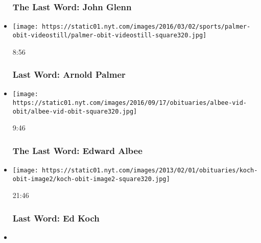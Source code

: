 \begin{itemize}
{  \subsubsection{The Last Word: John
  Glenn}\label{the-last-word-john-glenn}}
\item
  \href{https://www.nytimes.com/video/obituaries/100000001563119/last-word-arnold-palmer.html?action=click\&module=video-series-bar\&region=header\&pgtype=Article\&playlistId=video/last-word}{}

  \texttt{[image: https://static01.nyt.com/images/2016/03/02/sports/palmer-obit-videostill/palmer-obit-videostill-square320.jpg]}

  8:56

  \hypertarget{last-word-arnold-palmer}{%
  \subsubsection{Last Word: Arnold
  Palmer}\label{last-word-arnold-palmer}}
\item
  \href{https://www.nytimes.com/video/multimedia/1247463606959/the-last-word-edward-albee.html?action=click\&module=video-series-bar\&region=header\&pgtype=Article\&playlistId=video/last-word}{}

  \texttt{[image: https://static01.nyt.com/images/2016/09/17/obituaries/albee-vid-obit/albee-vid-obit-square320.jpg]}

  9:46

  \hypertarget{the-last-word-edward-albee}{%
  \subsubsection{The Last Word: Edward
  Albee}\label{the-last-word-edward-albee}}
\item
  \href{https://www.nytimes.com/video/obituaries/1194834046901/last-word-ed-koch.html?action=click\&module=video-series-bar\&region=header\&pgtype=Article\&playlistId=video/last-word}{}

  \texttt{[image: https://static01.nyt.com/images/2013/02/01/obituaries/koch-obit-image2/koch-obit-image2-square320.jpg]}

  21:46

  \hypertarget{last-word-ed-koch}{%
  \subsubsection{Last Word: Ed Koch}\label{last-word-ed-koch}}
\item
  \href{https://www.nytimes.com/video/us/1194834005471/last-word-barry-commoner.html?action=click\&module=video-series-bar\&region=header\&pgtype=Article\&playlistId=video/last-word}{}


\end{itemize}
